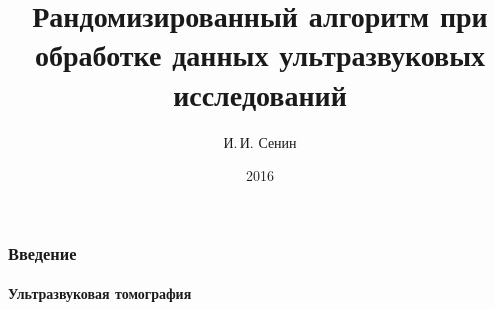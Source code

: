 \documentclass{beamer}
\begin{document}
\title[Бакалаврская работа]{Рандомизированный алгоритм при обработке данных ультразвуковых исследований}

\author[Иван Сенин]{
    \begin{flushright}
    И.\,И. Сенин \\
    {\footnotesize\textcolor{gray}}
    \end{flushright}
}

\date{2016}


\frame{\titlepage}

\begin{frame}
\frametitle{Введение}
\framesubtitle{Ультразвуковая томография}


\end{frame}
\end{document}
